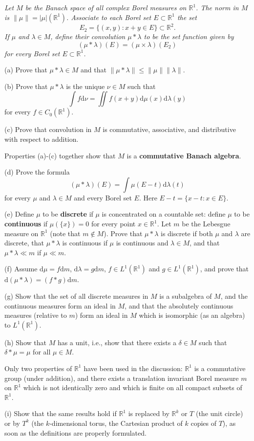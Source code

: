 \begin{problem}\em
Let $M$ be the Banach space of all complex Borel measures on $\mathbb{R}^1$. The norm in $M$ is $\|\mu\|=|\mu|(\mathbb{R}^1)$. Associate to each Borel set $E\subset\mathbb{R}^1$ the set 
$$E_2=\{(x,y):x+y\in E\}\subset\mathbb{R}^2.$$
If $\mu$ and $\lambda\in M$, define their convolution $\mu *\lambda$ to be the set function given by 
$$(\mu*\lambda)(E)=(\mu\times\lambda)(E_2)$$
for every Borel set $E\subset\mathbb{R}^1$.\par
(a) Prove that $\mu*\lambda\in M$ and that $\|\mu*\lambda\|\le\|\mu\|\|\lambda\|$.\par
(b) Prove that $\mu*\lambda$ is the unique $\nu\in M$ such that 
$$
\int{f\mathrm{d}\nu}=\iint{f\left( x+y \right) \mathrm{d}\mu \left( x \right) \mathrm{d}\lambda \left( y \right)}
$$
for every $f\in C_0(\mathbb{R}^1)$.\par
(c) Prove that convolution in $M$ is commutative, associative, and distributive with respect to addition.\par
Properties (a)-(c) together show that $M$ is a \textbf{commutative Banach algebra}.\par
(d) Prove the formula 
$$
\left( \mu *\lambda \right) \left( E \right) =\int{\mu \left( E-t \right) \mathrm{d}\lambda \left( t \right)}
$$
for every $\mu$ and $\lambda\in M$ and every Borel set $E$. Here $E-t=\{x-t:x\in E\}$.\par
(e) Define $\mu$ to be \textbf{discrete} if $\mu$ is concentrated on a countable set: define $\mu$ to be \textbf{continuous} if $\mu(\{x\})=0$ for every point $x\in\mathbb{R}^1$. Let $m$ be the Lebesgue measure on $\mathbb{R}^1$ (note that $m\notin M$). Prove that $\mu*\lambda$ is discrete if both $\mu$ and $\lambda$ are discrete, that $\mu*\lambda$ is continuous if $\mu$ is continuous and $\lambda\in M$, and that $\mu*\lambda\ll m$ if $\mu\ll m$.\par
(f) Assume $\mathrm{d}\mu=f\mathrm{d}m$, $\mathrm{d}\lambda=g\mathrm{d}m$, $f\in L^1(\mathbb{R}^1)$ and $g\in L^1(\mathbb{R}^1)$, and prove that $\mathrm{d}(\mu*\lambda)=(f*g)\mathrm{d}m$.\par
(g) Show that the set of all discrete measures in $M$ is a subalgebra of $M$, and the continuous measures form an ideal in $M$, and that the absolutely continuous measures (relative to $m$) form an ideal in $M$ which is isomorphic (as an algebra) to $L^1(\mathbb{R}^1)$.\par
(h) Show that $M$ has a unit, i.e., show that there exists a $\delta\in M$ such that $\delta*\mu=\mu$ for all $\mu\in M$.\par
Only two properties of $\mathbb{R}^1$ have been used in the discussion: $\mathbb{R}^1$ is a commutative group (under addition), and there exists a translation invariant Borel measure $m$ on $\mathbb{R}^1$ which is not identically zero and which is finite on all compact subsets of $\mathbb{R}^1$.\par
(i) Show that the same results hold if $\mathbb{R}^1$ is replaced by $\mathbb{R}^k$ or $T$ (the unit circle) or by $T^k$ (the $k$-dimensional torus, the Cartesian product of $k$ copies of $T$), as soon as the definitions are properly formulated.
\end{problem}
